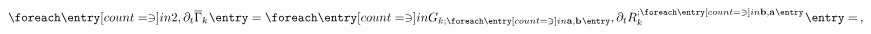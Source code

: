 \begin{align}
	\cm{2,\FSvertexDt{}}
	=\ncm{\FSpropagator{\FSidxI{a},\FSidxI{b}},\FSregulatorDt{\FSidxI{b},\FSidxI{a}}}
	=\,,\label{eq:FS0}
\end{align}